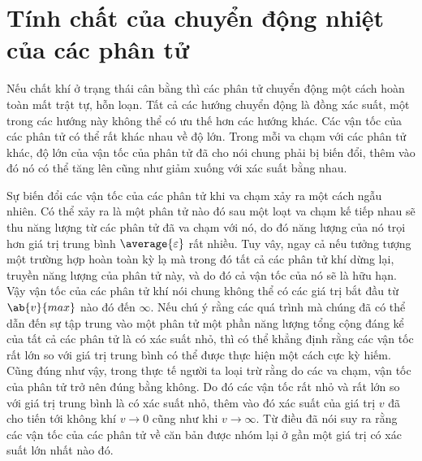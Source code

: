 \section{Tính chất của chuyển động nhiệt của các phân tử}\label{sec:11_2}

Nếu chất khí ở trạng thái cân bằng thì các phân tử chuyển động một cách hoàn toàn mất trật tự, hỗn loạn. Tất cả các hướng chuyển động là đồng xác suất, một trong các hướng này không thể có ưu thế hơn các hướng khác. Các vận tốc của các phân tử có thể rất khác nhau về độ lớn. Trong mỗi va chạm với các phân tử khác, độ lớn của vận tốc của phân tử đã cho nói chung phải bị biến đổi, thêm vào đó nó có thể tăng lên cũng như giảm xuống với xác suất bằng nhau.

Sự biến đổi các vận tốc của các phân tử khi va chạm xảy ra một cách ngẫu nhiên. Có thể xảy ra là một phân tử nào đó sau một loạt va chạm kế tiếp nhau sẽ thu năng lượng từ các phân tử đã va chạm với nó, do đó năng lượng của nó trọi hơn giá trị trung bình $\average{\varepsilon}$ rất nhiều. Tuy vây, ngay cả nếu tưởng tượng một trường hợp hoàn toàn kỳ lạ mà trong đó tất cả các phân tử khí dừng lại, truyền năng lượng của phân tử này, và do đó cả vận tốc của nó sẽ là hữu hạn. Vậy vận tốc của các phân tử khí nói chung không thể có các giá trị bắt đầu từ $\ab{v}{max}$ nào đó đến $\infty$. Nếu chú ý rằng các quá trình mà chúng đã có thể dẫn đến sự tập trung vào một phân tử một phần năng lượng tổng cộng đáng kể của tất cả các phân tử là có xác suất nhỏ, thì có thể khẳng định rằng các vận tốc rất lớn so với giá trị trung bình có thể được thực hiện một cách cực kỳ hiếm. Cũng đúng như vậy, trong thực tế người ta loại trừ rằng do các va chạm, vận tốc của phân tử trở nên đúng bằng không. Do đó các vận tốc rất nhỏ và rất lớn so với giá trị trung bình là có xác suất nhỏ, thêm vào đó xác suất của giá trị $v$ đã cho tiến tới không khí $v\to0$ cũng như khi $v\to\infty$. Từ điều đã nói suy ra rằng các vận tốc của các phân tử về căn bản được nhóm lại ở gần một giá trị có xác suất lớn nhất nào đó.

